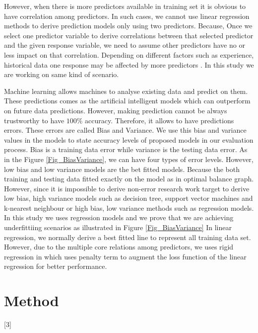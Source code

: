 However, when there is more predictors available in training set it is obvious to have correlation among predictors. 
In such cases, we cannot use linear regression methods to 
derive prediction models only using two predictors.
Because, Once we select one predictor variable to derive 
correlations between that 
selected predictor and the given response variable, we need to 
assume other predictors have no or less impact on that correlation.
Depending on different factors such as experience, historical 
data one response may be affected by more predictors \cite{seber2012linear}. 
In this study we are working on same kind of scenario.

Machine learning allows machines to analyse existing data and 
predict on them. These predictions comes as the 
artificial intelligent models which can outperform on future data predictions. 
However, making prediction cannot be always trustworthy 
to have $100\%$ accuracy. 
Therefore, it allows to have predictions errors. 
These errors are called Bias and Variance.
We use this bias and variance values in the models to state 
accuracy levels of proposed models in our evaluation process.
Bias is a training data error while variance is the testing data error.
As in the Figure \ref{Fig_BiasVariance}, we can have four types of error levels.
However, low bias and low variance models are the bet fitted models.
Because the both training and testing data fitted exactly on
the model as in optimal balance graph.
However, since it is impossible to derive non-error research
work target to derive low bias, high variance models such as
decision tree, support vector machines and k-nearest neighbour or high bias, low variance methods such as regression models.
In this study we uses regression models and we prove that
we are achieving underfittiing scenarios as illustrated in Figure \ref{Fig_BiasVariance}
In linear regression, we normally derive a best fitted line to represent all training data set.
However, due to the multiple core relations among predictors, we uses rigid regression in which uses penalty term to 
augment the loss function of the linear regression for better performance.

\gliMarker  %

\section{Method} \label{sec-method}

\blindtext
{}[3]
\blinditemize
\blindenumerate

